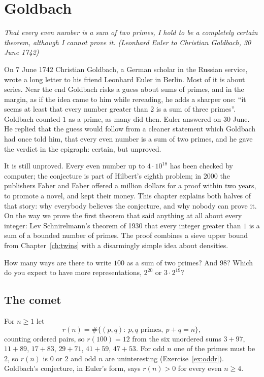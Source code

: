 \chapter{Goldbach}\label{ch:goldbach}

\begin{center}\itshape
That every even number is a sum of two primes, I hold to be a completely certain theorem, although I cannot prove it.
\upshape(Leonhard Euler to Christian Goldbach, 30 June 1742)
\end{center}

On 7 June 1742 Christian Goldbach, a German scholar in the Russian service, wrote a long letter to his friend Leonhard Euler in Berlin. Most of
it is about series. Near the end Goldbach risks a guess about sums of primes, and in the margin, as if the idea came to him while rereading, he adds a
sharper one: ``it seems at least that every number greater than $2$ is a sum of three primes''. Goldbach counted $1$ as a prime, as many did then. Euler
answered on 30 June. He replied that the guess would follow from a cleaner statement which Goldbach had once told him, that every even number is a sum of
two primes, and he gave the verdict in the epigraph: certain, but unproved.

It is still unproved. Every even number up to $4\cdot10^{18}$ has been checked by computer; the conjecture is part of Hilbert's eighth problem; in 2000
the publishers Faber and Faber offered a million dollars for a proof within two years, to promote a novel, and kept their money. This chapter explains
both halves of that story: why everybody believes the conjecture, and why nobody can prove it. On the way we prove the first theorem that said
anything at all about every integer: Lev Schnirelmann's theorem of 1930 that every integer greater than $1$ is a sum of a bounded number of primes.
The proof combines a sieve upper bound from Chapter~\ref{ch:twins} with a disarmingly simple idea about densities.

\begin{think}
How many ways are there to write $100$ as a sum of two primes? And $98$? Which do you expect to have more representations, $2^{20}$ or $3\cdot2^{19}$?
\end{think}

\section{The comet}

For $n\ge1$ let
\[
r(n)=\#\{(p,q):\ p,q\text{ primes},\ p+q=n\},
\]
counting ordered pairs, so $r(100)=12$ from the six unordered sums $3+97$, $11+89$, $17+83$, $29+71$, $41+59$, $47+53$. For odd $n$ one of the primes
must be $2$, so $r(n)$ is $0$ or $2$ and odd $n$ are uninteresting (Exercise~\ref{ex:oddr}). Goldbach's conjecture, in Euler's form, says
$r(n)>0$ for every even $n\ge4$.

